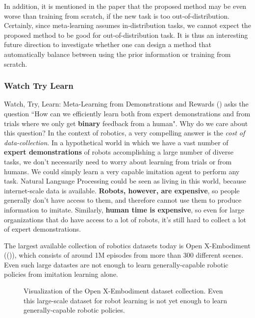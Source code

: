 \documentclass[
  letterpaper,
  numbers=noenddot,
  DIV=11]{scrreprt}
\theoremstyle{definition}
\theoremstyle{plain}
\theoremstyle{plain}
\theoremstyle{remark}
\begin{document}
In addition, it is mentioned in the paper that the proposed method may
be even worse than training from scratch, if the new task is too
out-of-distribution. Certainly, since meta-learning assumes
in-distribution tasks, we cannot expect the proposed method to be good
for out-of-distribution task. It is thus an interesting future direction
to investigate whether one can design a method that automatically
balance between using the prior information or training from scratch.

\subsubsection{Watch Try Learn}\label{sec-watch}

Watch, Try, Learn: Meta-Learning from Demonstrations and Rewards
() asks the question ``How
can we efficiently learn both from expert demonstrations and from trials
where we only get \textbf{binary} feedback from a human". Why do we care
about this question? In the context of robotics, a very compelling
answer is the \emph{cost of data-collection}. In a hypothetical world in
which we have a vast number of \textbf{expert demonstrations} of robots
accomplishing a large number of diverse tasks, we don't necessarily need
to worry about learning from trials or from humans. We could simply
learn a very capable imitation agent to perform any task. Natural
Language Processing could be seen as living in this world, because
internet-scale data is available. \textbf{Robots, however, are
expensive}, so people generally don't have access to them, and therefore
cannot use them to produce information to imitate. Similarly,
\textbf{human time is expensive}, so even for large organizations that
do have access to a lot of robots, it's still hard to collect a lot of
expert demonstrations.

The largest available collection of robotics datasets today is Open
X-Embodiment (()),
which consists of around 1M episodes from more than 300 different
scenes. Even such large datastes are not enough to learn
generally-capable robotic policies from imitation learning alone.

\begin{figure}


\caption{\label{fig-open-x-embodiment}Visualization of the Open
X-Embodiment dataset collection. Even this large-scale dataset for robot
learning is not yet enough to learn generally-capable robotic policies.}

\end{figure}%
\end{document}

